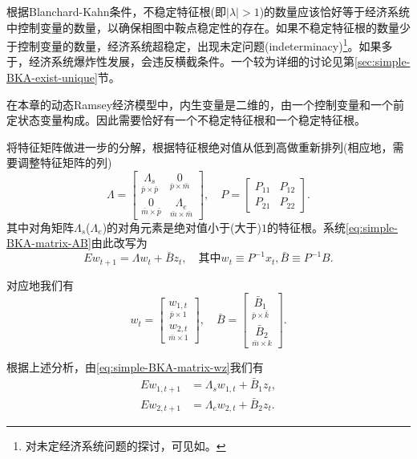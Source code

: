 根据Blanchard-Kahn条件，不稳定特征根(即$|\lambda|>1$)的数量应该恰好等于经济系统中控制变量的数量，以确保相图中鞍点稳定性的存在。如果不稳定特征根的数量少于控制变量的数量，经济系统超稳定，出现未定问题(indeterminacy)\footnote{对未定经济系统问题的探讨，可见如\cite{Benhabib1999}。}。如果多于，经济系统爆炸性发展，会违反横截条件。一个较为详细的讨论见第\ref{sec:simple-BKA-exist-unique}节。

在本章的动态Ramsey经济模型中，内生变量是二维的，由一个控制变量和一个前定状态变量构成。因此需要恰好有一个不稳定特征根和一个稳定特征根。

将特征矩阵做进一步的分解，根据特征根绝对值从低到高做重新排列(相应地，需要调整特征矩阵的列)
\begin{equation*}
  \Lambda = \begin{bmatrix}
  \underset{\bar{p} \times \bar{p}}{\Lambda_{s}} & \underset{\bar{p} \times \bar{m}}{0} \\
  \underset{\bar{m} \times \bar{p}}{0} & \underset{\bar{m} \times \bar{m}}{\Lambda_{e}}
\end{bmatrix}, \quad P = \begin{bmatrix}
P_{11} & P_{12} \\
P_{21} & P_{22}
\end{bmatrix}.
\end{equation*}
其中对角矩阵$\Lambda_s$($\Lambda_e$)的对角元素是绝对值小于(大于)$1$的特征根。系统\eqref{eq:simple-BKA-matrix-AB}由此改写为
\begin{equation}
  \label{eq:simple-BKA-matrix-wz}
  E w_{t+1} = \Lambda w_{t} + \bar{B} z_t, \quad \text{其中} w_t \equiv P^{-1}x_t, \bar{B} \equiv P^{-1} B.
\end{equation}

对应地我们有
\begin{equation*}
  w_t = \begin{bmatrix}
  \underset{\bar{p} \times 1}{w_{1,t}} \\
  \underset{\bar{m} \times 1}{w_{2,t}}
\end{bmatrix}, \quad \bar{B} = \begin{bmatrix}
  \underset{\bar{p} \times \bar{k}}{\bar{B}_{1}}\\
  \underset{\bar{m} \times {k}}{\bar{B}_{2}}
\end{bmatrix}.
\end{equation*}


根据上述分析，由\eqref{eq:simple-BKA-matrix-wz}我们有
\begin{subequations}
  \begin{align}
    \label{eq:simple-BKA-wsz}
    E w_{1,t+1} &= \Lambda_s w_{1,t} + \bar{B}_1 z_t, \\
    E w_{2,t+1} &= \Lambda_e w_{2,t} + \bar{B}_{2} z_t.
    \label{simple-BKA-wez}
  \end{align}
\end{subequations}

